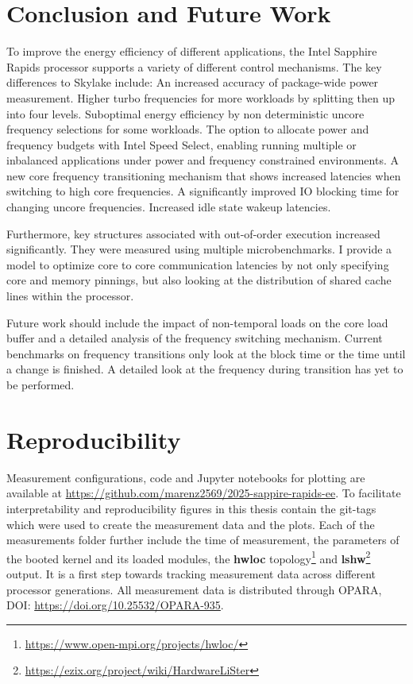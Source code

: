 \chapter{Conclusion and Future Work}
\label{sec:summary}

To improve the energy efficiency of different applications, the Intel Sapphire Rapids processor supports a variety of different control mechanisms.
The key differences to Skylake include:
An increased accuracy of package-wide power measurement.
Higher turbo frequencies for more workloads by splitting then up into four levels.
Suboptimal energy efficiency by non deterministic uncore frequency selections for some workloads.
The option to allocate power and frequency budgets with Intel Speed Select, enabling running multiple or inbalanced applications under power and frequency constrained environments.
A new core frequency transitioning mechanism that shows increased latencies when switching to high core frequencies.
A significantly improved IO blocking time for changing uncore frequencies.
Increased idle state wakeup latencies.

Furthermore, key structures associated with out-of-order execution increased significantly.
They were measured using multiple microbenchmarks.
I provide a model to optimize core to core communication latencies by not only specifying core and memory pinnings, but also looking at the distribution of shared cache lines within the processor.

Future work should include the impact of non-temporal loads on the core load buffer and a detailed analysis of the frequency switching mechanism.
Current benchmarks on frequency transitions only look at the block time or the time until a change is finished.
A detailed look at the frequency during transition has yet to be performed.

\chapter*{Reproducibility}
Measurement configurations, code and Jupyter notebooks for plotting are available at \url{https://github.com/marenz2569/2025-sappire-rapids-ee}.
To facilitate interpretability and reproducibility figures in this thesis contain the git-tags which were used to create the measurement data and the plots.
Each of the measurements folder further include the time of measurement, the parameters of the booted kernel and its loaded modules, the \textbf{hwloc} topology\footnote{\url{https://www.open-mpi.org/projects/hwloc/}} and \textbf{lshw}\footnote{\url{https://ezix.org/project/wiki/HardwareLiSter}} output.
It is a first step towards tracking measurement data across different processor generations.
All measurement data is distributed through OPARA, DOI: \url{https://doi.org/10.25532/OPARA-935}.
